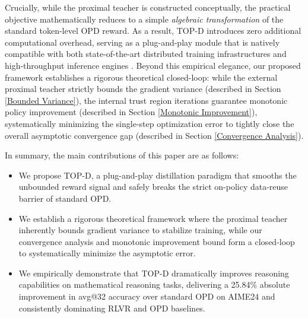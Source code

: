 \documentclass{article}
\theoremstyle{plain}
\theoremstyle{definition}
\theoremstyle{remark}
\begin{document}
Crucially, while the proximal teacher is constructed conceptually, the practical objective mathematically reduces to a simple \textit{algebraic transformation} of the standard token-level OPD reward. As a result, TOP-D introduces zero additional computational overhead, serving as a plug-and-play module that is natively compatible with both state-of-the-art distributed training infrastructures \citep{shoeybi2019megatron, zhao2023pytorch} and high-throughput inference engines \citep{kwon2023efficient, zheng2024sglang}. Beyond this empirical elegance, our proposed framework establishes a rigorous theoretical closed-loop: while the external proximal teacher strictly bounds the gradient variance (described in Section \ref{Bounded Variance}), the internal trust region iterations guarantee monotonic policy improvement (described in Section \ref{Monotonic Improvement}), systematically minimizing the single-step optimization error to tightly close the overall asymptotic convergence gap (described in Section \ref{Convergence Analysis}).

In summary, the main contributions of this paper are as follows:
\begin{itemize}
	\item We propose TOP-D, a plug-and-play distillation paradigm that smooths the unbounded reward signal and safely breaks the strict on-policy data-reuse barrier of standard OPD.
	\item We establish a rigorous theoretical framework where the proximal teacher inherently bounds gradient variance to stabilize training, while our convergence analysis and monotonic improvement bound form a closed-loop to systematically minimize the asymptotic error.
	\item We empirically demonstrate that TOP-D dramatically improves reasoning capabilities on mathematical reasoning tasks, delivering a 25.84\% absolute improvement in avg@32 accuracy over standard OPD on AIME24 and consistently dominating RLVR and OPD baselines.
\end{itemize}
\end{document}
